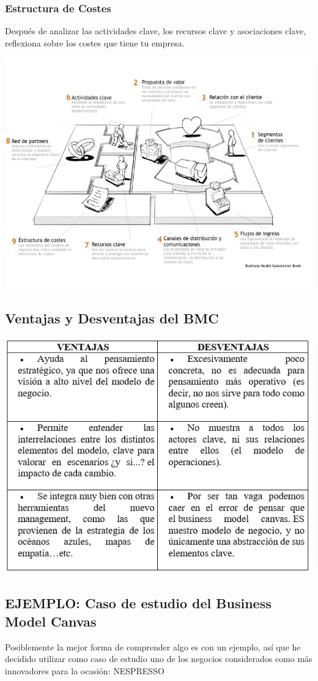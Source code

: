 \documentclass[10pt,a4paper]{article}
\begin{document}
\subsubsection{Estructura de Costes}
				Después de analizar las actividades clave, los recursos clave y asociaciones clave, reflexiona sobre los costes que tiene tu empresa. 
				
			\begin{center}
				\includegraphics[scale=0.6]{./Imagenes/img02}
			\end{center}
			
		\subsection{Ventajas y Desventajas del BMC}
		
		\begin{center}
			\includegraphics[scale=0.65]{./Imagenes/img03}
		\end{center}
	
		\subsection{EJEMPLO: Caso de estudio del Business Model Canvas}
		
		Posiblemente la mejor forma de comprender algo es con un ejemplo, así que he decidido utilizar como caso de estudio uno de los negocios considerados como más innovadores para la ocasión: NESPRESSO
				
				
			
\end{document}
